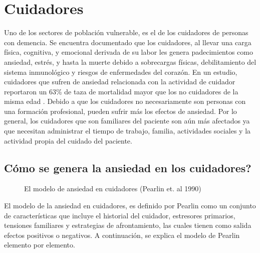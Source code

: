 \section{Cuidadores}\label{secc:caregivers}
Uno de los sectores de poblaci\'on vulnerable, es el de los cuidadores de personas con demencia. Se encuentra documentado que los cuidadores, al llevar una carga f\'isica, cognitiva, y emocional derivada de su labor les genera padecimientos como ansiedad, estr\'es, y hasta la muerte \citep{Chen2013} debido a sobrecargas f\'isicas, debilitamiento del sistema inmunol\'ogico y riesgos de enfermedades del coraz\'on. En un estudio, cuidadores que sufren de ansiedad relacionada con la actividad de cuidador reportaron un 63\% de taza de mortalidad mayor que los no cuidadores de la misma edad \citep{bonsang282shulz}. Debido a que los cuidadores no necesariamente son personas con una formaci\'on profesional, pueden sufrir m\'as los efectos de ansiedad. Por lo general, los cuidadores que son familiares del paciente son a\'un m\'as afectados ya que necesitan administrar el tiempo de trabajo, familia, actividades sociales y la actividad propia del cuidado del paciente.

\subsection{C\'omo se genera la ansiedad en los cuidadores?}\label{secc:caregiverburden}

\begin{figure}[h]
	\centering
	\caption{El modelo de ansiedad en cuidadores (Pearlin et. al 1990)} \label{fig:modeloAnsiedad}
\end{figure}
El modelo de la ansiedad en cuidadores, es definido por Pearlin como un conjunto de caracter\'isticas que incluye el historial del cuidador, estresores primarios, tensiones familiares y estrategias de afrontamiento, las cuales tienen como salida efectos positivos o negativos\citep{Pearlin01101990}. A continuaci\'on, se explica el modelo de Pearlin elemento por elemento.
